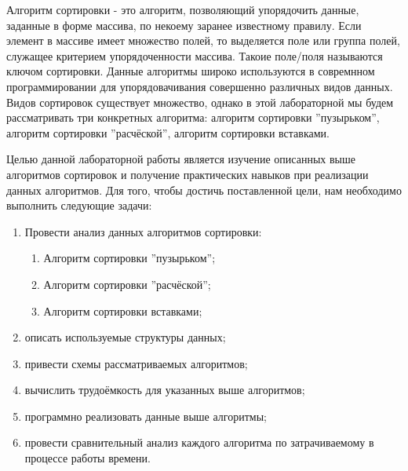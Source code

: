 \Introduction
Алгоритм сортировки - это алгоритм, позволяющий упорядочить данные, заданные в форме массива, по некоему заранее известному правилу. Если элемент в массиве имеет множество полей, то выделяется поле или группа полей, служащее критерием упорядоченности массива. Такоие поле/поля называются ключом сортировки. Данные алгоритмы широко используются в совремнном программировании для упорядовачивания совершенно различных видов данных. Видов сортировок существует множество, однако в этой лабораторной мы будем рассматривать три конкретных алгоритма: алгоритм сортировки ''пузырьком'', алгоритм сортировки ''расчёской'', алгоритм сортировки вставками.

Целью данной лабораторной работы является изучение описанных выше алгоритмов сортировок и получение практических навыков при реализации данных алгоритмов. Для того, чтобы достичь поставленной цели, нам необходимо выполнить следующие задачи:

\begin{enumerate}
\item Провести анализ данных алгоритмов сортировки:
		\begin{enumerate} 
			\item Алгоритм сортировки ''пузырьком'';
			\item Алгоритм сортировки ''расчёской'';
			\item Алгоритм сортировки вставками;
		\end{enumerate}
	\item описать используемые структуры данных;
	\item привести схемы рассматриваемых алгоритмов;
	\item вычислить трудоёмкость для указанных выше алгоритмов;
	\item программно реализовать данные выше алгоритмы;
	\item провести сравнительный анализ каждого алгоритма по затрачиваемому в процессе работы времени.
\end{enumerate}
